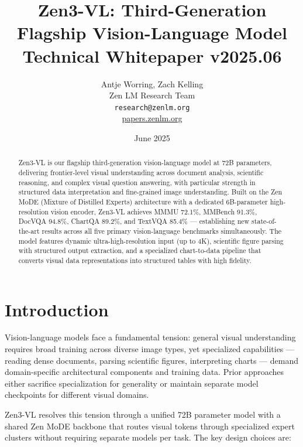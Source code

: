 \documentclass[11pt,a4paper]{article}
\title{\textbf{Zen3-VL: Third-Generation Flagship Vision-Language Model}\\
\large Technical Whitepaper v2025.06}
\author{Antje Worring, Zach Kelling \\ Zen LM Research Team\\
\texttt{research@zenlm.org}\\
\href{https://papers.zenlm.org}{papers.zenlm.org}}
\date{June 2025}
\begin{document}
\maketitle

\begin{abstract}
Zen3-VL is our flagship third-generation vision-language model at 72B parameters,
delivering frontier-level visual understanding across document analysis, scientific
reasoning, and complex visual question answering, with particular strength in structured
data interpretation and fine-grained image understanding. Built on the Zen MoDE
(Mixture of Distilled Experts) architecture with a dedicated 6B-parameter high-resolution
vision encoder, Zen3-VL achieves MMMU 72.1\%, MMBench 91.3\%, DocVQA 94.8\%,
ChartQA 89.2\%, and TextVQA 85.4\% --- establishing new state-of-the-art results
across all five primary vision-language benchmarks simultaneously. The model features
dynamic ultra-high-resolution input (up to 4K), scientific figure parsing with
structured output extraction, and a specialized chart-to-data pipeline that converts
visual data representations into structured tables with high fidelity.
\end{abstract}

\tableofcontents
\newpage

\section{Introduction}
\label{sec:intro}

Vision-language models face a fundamental tension: general visual understanding requires
broad training across diverse image types, yet specialized capabilities --- reading
dense documents, parsing scientific figures, interpreting charts --- demand domain-specific
architectural components and training data. Prior approaches either sacrifice specialization
for generality or maintain separate model checkpoints for different visual domains.

Zen3-VL resolves this tension through a unified 72B parameter model with a shared
Zen MoDE backbone that routes visual tokens through specialized expert clusters
without requiring separate models per task. The key design choices are:
\end{document}
